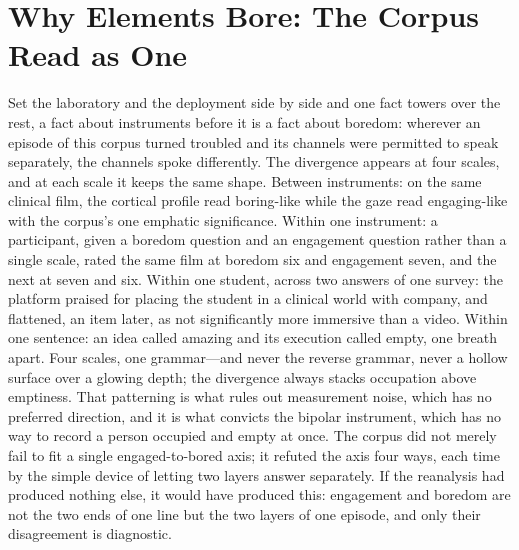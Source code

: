 
\section{Why Elements Bore: The Corpus Read as One}

Set the laboratory and the deployment side by side and one fact towers over the rest, a fact about instruments before it is a fact about boredom: wherever an episode of this corpus turned troubled and its channels were permitted to speak separately, the channels spoke differently. The divergence appears at four scales, and at each scale it keeps the same shape. Between instruments: on the same clinical film, the cortical profile read boring-like while the gaze read engaging-like with the corpus's one emphatic significance. Within one instrument: a participant, given a boredom question and an engagement question rather than a single scale, rated the same film at boredom six and engagement seven, and the next at seven and six. Within one student, across two answers of one survey: the platform praised for placing the student in a clinical world with company, and flattened, an item later, as not significantly more immersive than a video. Within one sentence: an idea called amazing and its execution called empty, one breath apart. Four scales, one grammar---and never the reverse grammar, never a hollow surface over a glowing depth; the divergence always stacks occupation above emptiness. That patterning is what rules out measurement noise, which has no preferred direction, and it is what convicts the bipolar instrument, which has no way to record a person occupied and empty at once. The corpus did not merely fail to fit a single engaged-to-bored axis; it refuted the axis four ways, each time by the simple device of letting two layers answer separately. If the reanalysis had produced nothing else, it would have produced this: engagement and boredom are not the two ends of one line but the two layers of one episode, and only their disagreement is diagnostic.

